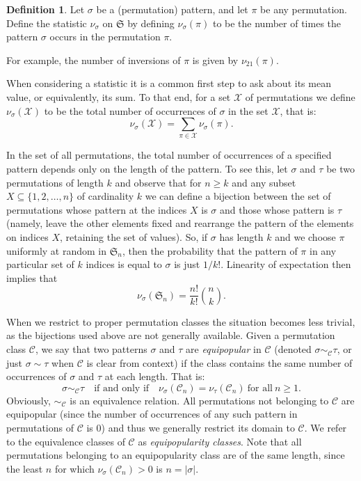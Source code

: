 \documentclass[10pt]{article}
\theoremstyle{definition}
\newtheorem{definition}[theorem]{Definition}
\numberwithin{equation}{section}
\numberwithin{figure}{section}
\begin{document}
\begin{definition}
Let $\sigma$ be a (permutation) pattern, and let $\pi$ be any permutation.  Define the statistic $\nu_{\sigma}$ on $\mathfrak{S}$ by defining $\nu_\sigma(\pi)$ to be the number of times the pattern $\sigma$ occurs in the permutation $\pi$. 
\end{definition}

For example, the number of inversions of $\pi$ is given by $\nu_{21}(\pi)$.

When considering a statistic it is a common first step to ask about its mean value, or equivalently, its sum. To that end, for a set $\mathcal{X}$ of permutations we define $\nu_\sigma(\mathcal{X})$ to be the total number of occurrences of $\sigma$ in the set $\mathcal{X}$, that is: 
\[
\nu_{\sigma}(\mathcal{X}) = \sum_{\pi \in \mathcal{X}} \nu_{\sigma}(\pi).
\]

In the set of all permutations, the total number of occurrences of a specified pattern depends only on the length of the pattern. To see this, let $\sigma$ and $\tau$ be two permutations of length $k$ and observe that for $n \geq k$ and any subset $X \subseteq \{1,2,\dots, n\}$ of cardinality $k$ we can define a bijection between the set of permutations whose pattern at the indices $X$ is $\sigma$ and those whose pattern is $\tau$ (namely, leave the other elements fixed and rearrange the pattern of the elements on indices $X$, retaining the set of values). So, if $\sigma$ has length $k$ and we choose $\pi$ uniformly at random in $\mathfrak{S}_n$, then the probability that the pattern of $\pi$ in any particular set of $k$ indices is equal to $\sigma$ is just $1/k!$. Linearity of expectation then implies that 
\[
\nu_{\sigma}(\mathfrak{S}_n) = \frac{n!}{k!} \binom{n}{k}.
\]

When we restrict to proper permutation classes the situation becomes less trivial, as the bijections used above are not generally available. Given a permutation class $\mathcal{C}$, we say that two patterns $\sigma$ and $\tau$ are \emph{equipopular} in $\mathcal{C}$ (denoted $\sigma \sim_{\mathcal{C}} \tau$, or just $\sigma \sim \tau$ when $\mathcal{C}$ is clear from context) if the class contains the same number of occurrences of $\sigma$ and $\tau$ at each length. That is: 
\[
\sigma \sim_{\mathcal{C}} \tau \quad \text{if and only if} \quad
\nu_\sigma(\mathcal{C}_n) = \nu_\tau(\mathcal{C}_n) \ \text{for all} \
    n \geq 1.
\]
Obviously, $\sim_{\mathcal{C}}$ is an equivalence relation. All permutations not belonging to $\mathcal{C}$ are equipopular (since the number of occurrences of any such pattern in permutations of $\mathcal{C}$ is 0) and thus we generally restrict its domain to $\mathcal{C}$. We refer to the equivalence classes of $\mathcal{C}$ as \emph{equipopularity classes}. Note that all permutations belonging to an equipopularity class are of the same length, since the least $n$ for which $\nu_{\sigma} (\mathcal{C}_n) > 0$ is $n=|\sigma|$.
  
\end{document}
